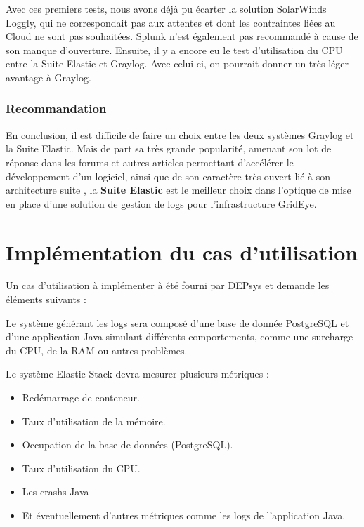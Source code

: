 \documentclass[paper=a4, fontsize=11pt]{scrartcl}
\begin{document}
Avec ces premiers tests, nous avons déjà pu écarter la solution SolarWinds Loggly, qui ne correspondait pas aux attentes et dont les contraintes liées au Cloud ne sont pas souhaitées. Splunk n'est également pas recommandé à cause de son manque d'ouverture.
Ensuite, il y a encore eu le test d'utilisation du CPU entre la Suite Elastic et Graylog. Avec celui-ci, on pourrait donner un très léger avantage à Graylog.

\subsubsection{Recommandation}
En conclusion, il est difficile de faire un choix entre les deux systèmes Graylog et la Suite Elastic. Mais de part sa très grande popularité, amenant son lot de réponse dans les forums et autres articles permettant d'accélérer le développement d'un logiciel, ainsi que de son caractère très ouvert lié à son \og architecture suite \fg, la \textbf{Suite Elastic} est le meilleur choix dans l'optique de mise en place d'une solution de gestion de logs pour l'infrastructure GridEye.

\newpage

\section{Implémentation du cas d'utilisation}

Un cas d'utilisation à implémenter à été fourni par DEPsys et demande les éléments suivants :

Le système générant les logs sera composé d'une base de donnée PostgreSQL \cite{noauthor_postgresql_nodate} et d'une application Java \cite{noauthor_java_nodate} simulant différents comportements, comme une surcharge du CPU, de la RAM ou autres problèmes.

Le système Elastic Stack devra mesurer plusieurs métriques :
\begin{itemize}
    \item Redémarrage de conteneur.
    \item Taux d'utilisation de la mémoire.
    \item Occupation de la base de données (PostgreSQL).
    \item Taux d'utilisation du CPU.
    \item Les crashs Java
    \item Et éventuellement d'autres métriques comme les logs de l'application Java.
\end{itemize}
\end{document}
